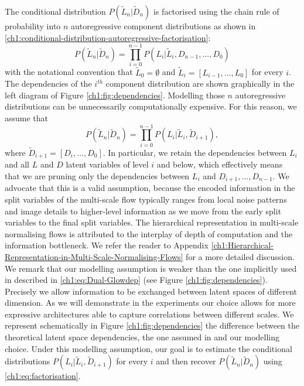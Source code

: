 The conditional distribution $P(\tilde{L}_n| \tilde{D}_n)$ is factorised using the chain rule of probability into $n$ autoregressive component distributions as shown in \eqref{ch1:conditional-distribution-autoregressive-factorisation}:
\begin{equation}\label{ch1:conditional-distribution-autoregressive-factorisation}
    P(\tilde{L}_n| \tilde{D}_n) = \prod_{i=0}^{n-1}P(L_i|\tilde{L}_{i},D_{n-1},...,D_0)
\end{equation}
with the notational convention that $\tilde{L}_{0}=\emptyset$ and $\tilde L_{i} = [L_{i-1}, \ldots, L_0]$ for every $i$. The dependencies of the $i^{th}$ component distribution are shown graphically in the left diagram of Figure \ref{ch1:fig:dependencies}. Modelling those $n$ autoregressive distributions can be unnecessarily computationally expensive. For this reason, we assume that 
\begin{equation}\label{ch1:eq:factorisation}
    P(\tilde{L}_n| \tilde{D}_n)= \prod_{i=0}^{n-1}P(L_i|\tilde{L}_{i},\tilde D_{i+1}),
\end{equation}
where $\tilde D_{i+1} = [D_{i}, \ldots, D_0]$. In particular, we retain the dependencies between $L_{i}$ and all $L$ and $D$ latent variables of level $i$ and below, which effectively means that we are pruning only the dependencies between  $L_{i}$ and $D_{i+1},...,D_{n-1}$. We advocate that this is a valid assumption, because the encoded information in the split variables of the multi-scale flow typically ranges from local noise patterns and image details to higher-level information as we move from the early split variables to the final split variables.  The hierarchical representation in multi-scale normalising flows is attributed to the interplay of depth of computation and the information bottleneck. We refer the reader to Appendix \ref{ch1:Hierarchical-Representation-in-Multi-Scale-Normalising-Flows} for a more detailed discussion. \\ \color{black}
We remark that our modelling assumption is weaker than the one implicitly used in \cite{Dual-Glow} described in \eqref{ch1:eq:Dual-Glowdep} (see Figure \ref{ch1:fig:dependencies}). Precisely we allow information to be exchanged between latent spaces of different dimension. As we will demonstrate in the experiments our choice allows for more expressive architectures able to capture correlations between different scales.
We represent schematically in Figure \ref{ch1:fig:dependencies} the difference between the theoretical latent space dependencies, the one assumed in \cite{Dual-Glow} and our modelling choice. 
Under this modelling assumption, our goal is to estimate the conditional distributions $P(L_i|\tilde{L}_{i},\tilde D_{i+1})$ for every $i$ and then recover 
$P(\tilde{L}_n| \tilde{D}_n)$ using \eqref{ch1:eq:factorisation}.

